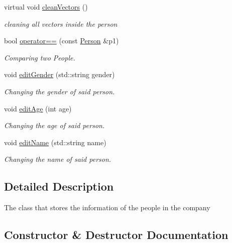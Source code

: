 \begin{DoxyCompactItemize}
\mbox{\label{class_person_ae524672604b31635f981361d604bac7b}} 
virtual void \mbox{\hyperlink{class_person_ae524672604b31635f981361d604bac7b}{clean\+Vectors}} ()
\begin{DoxyCompactList}\small\item\em cleaning all vectors inside the person \end{DoxyCompactList}\item 
bool \mbox{\hyperlink{class_person_aa2fe338cbcf08ee5981dce811fd3a50a}{operator==}} (const \mbox{\hyperlink{class_person}{Person}} \&p1)
\begin{DoxyCompactList}\small\item\em Comparing two People. \end{DoxyCompactList}\item 
void \mbox{\hyperlink{class_person_a3462440c2938aaea073cdaeeb9c0ad9d}{edit\+Gender}} (std\+::string gender)
\begin{DoxyCompactList}\small\item\em Changing the gender of said person. \end{DoxyCompactList}\item 
void \mbox{\hyperlink{class_person_af00065ecb43ca488a2f90fe5dc796095}{edit\+Age}} (int age)
\begin{DoxyCompactList}\small\item\em Changing the age of said person. \end{DoxyCompactList}\item 
void \mbox{\hyperlink{class_person_ade234dfe2fb73a9ae41bac93b52c17c6}{edit\+Name}} (std\+::string name)
\begin{DoxyCompactList}\small\item\em Changing the name of said person. \end{DoxyCompactList}\end{DoxyCompactItemize}


\subsection{Detailed Description}
The class that stores the information of the people in the company 

\subsection{Constructor \& Destructor Documentation}
\mbox{\label{class_person_a19ba5bb7e92c776268b3d453b4ef55b2}} 
